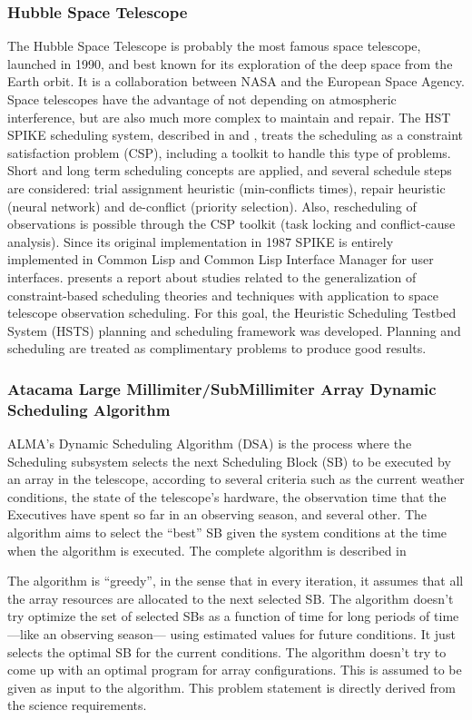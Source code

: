 \documentclass[11pt]{article}
\begin{document}
\subsubsection{Hubble Space Telescope}
The Hubble Space Telescope is probably the most famous space telescope, launched in 1990, and best known for its exploration of the deep space from the Earth orbit. It is a collaboration between NASA and the European Space Agency. Space telescopes have the advantage of not depending on atmospheric interference, but are also much more complex to maintain and repair. The HST SPIKE scheduling system, described in \cite{johnston90} and \cite{zweben94}, treats the scheduling as a constraint satisfaction problem (CSP), including a toolkit to handle this type of problems. Short and long term scheduling concepts are applied, and several schedule steps are considered: trial assignment heuristic (min-conflicts times), repair heuristic (neural network) and de-conflict (priority selection). Also, rescheduling of observations is possible through the CSP toolkit (task locking and conflict-cause analysis). Since its original implementation in 1987 SPIKE is entirely implemented in Common Lisp and Common Lisp Interface Manager for user interfaces. \cite{muscettola96} presents a report about studies related to the generalization of constraint-based scheduling theories and techniques with application to space telescope observation scheduling. For this goal, the Heuristic Scheduling Testbed System (HSTS) planning and scheduling framework was developed. Planning and scheduling are treated as complimentary problems to produce good results.

\subsubsection{Atacama Large Millimiter/SubMillimiter Array Dynamic Scheduling Algorithm}
\label{sec:alma-dsa}

ALMA's Dynamic Scheduling Algorithm (DSA) is the process where the Scheduling subsystem selects the next Scheduling Block (SB) to be executed by an array in the telescope, according to several criteria such as the current weather conditions, the state of the telescope's hardware, the observation time that the Executives have spent so far in an observing season, and several other. The algorithm aims to select the ``best'' SB given the system conditions at the time when the algorithm is executed. The complete algorithm is described in \cite{avarias11} 

The algorithm is ``greedy'', in the sense that in every iteration, it assumes that all the array resources are allocated to the next selected SB. The algorithm doesn't try optimize the set of selected SBs as a function of time for long periods of time ---like an observing season--- using estimated values for future conditions. It just selects the optimal SB for the current conditions. The algorithm doesn't try to come up with an optimal program for array configurations. This is assumed to be given as input to the algorithm. This problem statement is directly derived from the science requirements.
\end{document}
